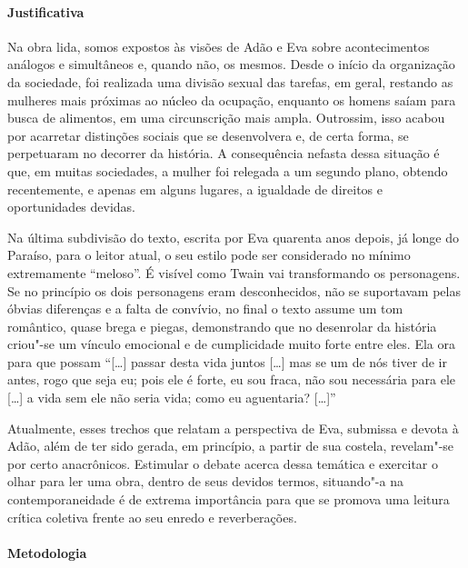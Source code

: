\documentclass[12pt]{extarticle}
\begin{document}
\paragraph{Justificativa} Na obra lida, somos expostos às visões de Adão e Eva sobre
acontecimentos análogos e simultâneos e, quando não, os mesmos. Desde o
início da organização da sociedade, foi realizada uma divisão sexual das
tarefas, em geral, restando as mulheres mais próximas ao núcleo da
ocupação, enquanto os homens saíam para busca de alimentos, em uma
circunscrição mais ampla. Outrossim, isso acabou por acarretar
distinções sociais que se desenvolvera e, de certa forma, se perpetuaram
no decorrer da história. A consequência nefasta dessa situação é que, em
muitas sociedades, a mulher foi relegada a um segundo plano, obtendo
recentemente, e apenas em alguns lugares, a igualdade de direitos e
oportunidades devidas. 

Na última subdivisão do texto, escrita por Eva quarenta anos
depois, já longe do Paraíso, para o leitor atual, o seu estilo pode
ser considerado no mínimo extremamente ``meloso''. É visível como Twain vai
transformando os personagens. Se no princípio os dois personagens
eram desconhecidos, não se suportavam pelas óbvias
diferenças e a falta de convívio, no final o texto assume
um tom romântico, quase brega e piegas, demonstrando que
no desenrolar da história criou"-se um vínculo emocional e
de cumplicidade muito forte entre eles. 
Ela ora para que possam ``{[}\ldots{}{]} passar desta vida 
juntos {[}\ldots{}{]} mas se um de nós tiver
de ir antes, rogo que seja eu; pois ele é forte, eu sou fraca,
não sou necessária para ele {[}\ldots{}{]} a vida sem ele não seria vida;
como eu aguentaria? {[}\ldots{}{]}''

Atualmente, esses trechos que relatam a perspectiva de Eva, submissa 
e devota à Adão, além de ter sido 
gerada, em princípio, a partir de sua costela, revelam"-se 
por certo anacrônicos. 
Estimular o debate acerca dessa temática e exercitar o olhar 
para ler uma obra, dentro de seus devidos termos, 
situando"-a na contemporaneidade é de extrema importância para 
que se promova uma leitura crítica coletiva frente 
ao seu enredo e reverberações. 

\paragraph{Metodologia} 
\end{document}

